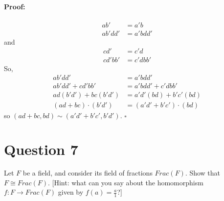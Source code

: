 \documentclass [12pt] {article}
\newenvironment{proof}{\paragraph{Proof:}}{\hfill$\square$}
\begin{document}
\begin{enumerate}
\begin{proof}
            \begin{align*}
                ab' &= a'b \\
                ab'dd' &= a'bdd'
            \end{align*}
            and
            \begin{align*}
                cd' &= c'd \\
                cd'bb' &= c'dbb'
            \end{align*}
            So,
            \begin{align*}
                ab'dd' &= a'bdd' \\
                ab'dd' + cd'bb' &= a'bdd' + c'dbb' \\
                ad(b'd') + bc(b'd') &= a'd'(bd) + b'c'(bd) \\
                (ad + bc) \cdot (b'd') &= (a'd' + b'c') \cdot (bd)
            \end{align*}
            so $(ad + bc, bd) \sim (a'd' + b'c', b'd')$.
        \end{proof}
\end{enumerate}
\newpage


\section*{Question 7}
Let $F$ be a field, and consider its field of fractions $Frac(F)$. Show that $F\cong Frac(F)$.
[Hint: what can you say about the homomorphism $f:F\to Frac(F)$ given by $f(a)=\frac{a}{1}$?]
\end{document}
